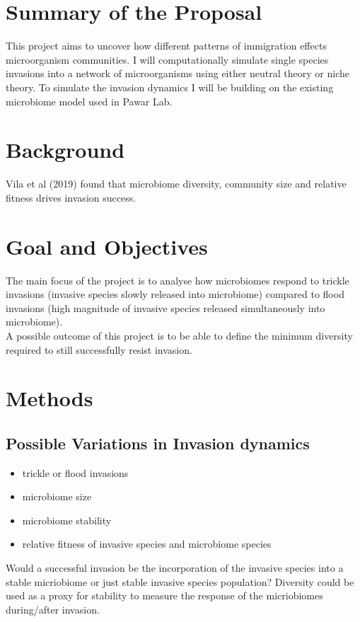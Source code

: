 \section*{Summary of the Proposal}
This project aims to uncover how different patterns of immigration effects microorganism communities. I will computationally simulate single species invasions into a network of microorganisms using either neutral theory or niche theory. To simulate the invasion dynamics I will be building on the existing microbiome model used in Pawar Lab.

\section*{Background}
Vila et al (2019) found that microbiome diversity, community size and relative fitness drives invasion success. 

\section*{Goal and Objectives}
The main focus of the project is to analyse how microbiomes respond to trickle invasions (invasive species slowly released into microbiome) compared to flood invasions (high magnitude of invasive species released simultaneously into microbiome).  \\ A possible outcome of this project is to be able to define the minimum diversity required to still successfully resist invasion.

\section*{Methods}
\subsection{Possible Variations in Invasion dynamics}
\begin{itemize}
    \item trickle or flood invasions
    \item microbiome size
    \item microbiome stability
    \item relative fitness of invasive species and microbiome species
\end{itemize}

Would a successful invasion be the incorporation of the invasive species into a stable micriobiome or just stable invasive species population?
Diversity could be used as a proxy for stability to measure the response of the micriobiomes during/after invasion. 